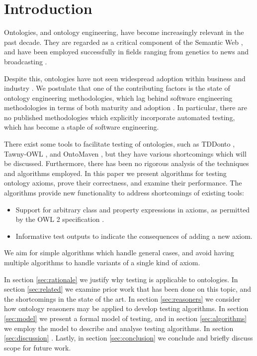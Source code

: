 \documentclass[paper.tex]{subfiles}
\begin{document}
\section{Introduction}
\label{sec:intro}

Ontologies, and ontology engineering, have become increasingly relevant in the past decade.
They are regarded as a critical component of the Semantic Web \cite{BernersLee:SemanticWeb}, and have been employed successfully in fields ranging from genetics \cite{GeneOntology:GoingForward} to news and broadcasting \cite{BBC:LinkedData}.

Despite this, ontologies have not seen widespread adoption within business and industry \cite{Cardoso:SemanticWebVision, Kaczmarek:EnterpriseModelling}.
We postulate that one of the contributing factors is the state of ontology engineering methodologies, which lag behind software engineering methodologies in terms of both maturity and adoption \cite{Iqbal:Methodologies, Simperl:Maturity}.
In particular, there are no published methodologies which explicitly incorporate automated testing, which has become a staple of software engineering.

There exist some tools to facilitate testing of ontologies, such as TDDonto \cite{Lawrynowicz:TDDontoTool}, Tawny-OWL \cite{Warrender:HowWhatWhyTest}, and OntoMaven \cite{Paschke:AspectOntoMaven}, but they have various shortcomings which will be discussed.
Furthermore, there has been no rigorous analysis of the techniques and algorithms employed.
In this paper we present algorithms for testing ontology axioms, prove their correctness, and \todo[TBC] examine their performance.
The algorithms provide new functionality to address shortcomings of existing tools:
\begin{itemize}[nosep]
  \item Support for arbitrary class and property expressions in axioms, as permitted by the OWL 2 specification \cite{W3C:OWL2Syntax}.
  \item Informative test outputs to indicate the consequences of adding a new axiom.
\end{itemize}
We aim for simple algorithms which handle general cases, and avoid having multiple algorithms to handle variants of a single kind of axiom.
 


In section \ref{sec:rationale} we justify why testing is applicable to ontologies.
In section \ref{sec:related} we examine prior work that has been done on this topic, and the shortcomings in the state of the art.
In section \ref{sec:reasoners} we consider how ontology reasoners may be applied to develop testing algorithms.
In section \ref{sec:model} we present a formal model of testing, and in section \ref{sec:algorithms} we employ the model to describe and analyse testing algorithms.
In section \ref{sec:discussion} .
Lastly, in section \ref{sec:conclusion} we conclude and briefly discuss scope for future work.
\end{document}
